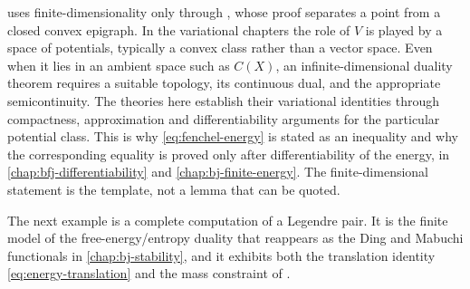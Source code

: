 \begin{remark}
\label{rem:legendre-infinite-dimensional}
 uses finite-dimensionality only through
, whose proof separates a point from a closed
convex epigraph.  In the variational chapters the role of $V$ is played by a
space of potentials, typically a convex class rather than a vector space.
Even when it lies in an ambient space such as $C(X)$, an infinite-dimensional
duality theorem requires a suitable topology, its continuous dual, and the
appropriate semicontinuity.  The theories here establish their variational
identities through compactness, approximation and differentiability
arguments for the particular potential class.  This is why
\eqref{eq:fenchel-energy} is stated as an
inequality and why the corresponding equality is proved only after
differentiability of the energy, in \cref{chap:bfj-differentiability} and
\cref{chap:bj-finite-energy}.  The finite-dimensional statement is the
template, not a lemma that can be quoted.
\end{remark}

The next example is a complete computation of a Legendre pair.  It is the
finite model of the free-energy/entropy duality that reappears as the
Ding and Mabuchi functionals in \cref{chap:bj-stability}, and it exhibits both
the translation identity \eqref{eq:energy-translation} and the mass constraint
of .

